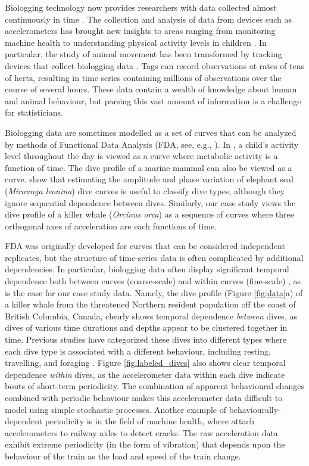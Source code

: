 Biologging technology now provides researchers with data collected almost continuously in time \citep{Hooten:2017}.
The collection and analysis of data from devices such as accelerometers has brought new insights to areas ranging from monitoring machine health \citep{Getman:2009} to understanding physical activity levels in children \citep{Morris:2007}. In particular, the study of animal movement has been transformed by tracking devices that collect biologging data \citep{Borger:2020}. Tags can record observations at rates of tens of hertz, resulting in time series containing millions of observations over the course of several hours. These data contain a wealth of knowledge about human and animal behaviour, but parsing this vast amount of information is a challenge for statisticians.

Biologging data are sometimes modelled as a set of curves that can be analyzed by methods of Functional Data Analysis (FDA, see, e.g., \citealt{Ramsay:2005}). In \cite{Morris:2007}, a child's activity level throughout the day is viewed as a curve where metabolic activity is a function of time. The dive profile of a marine mammal can also be viewed as a curve. \citet{Fu:2017} show that estimating the amplitude and phase variation of elephant seal (\textit{Mirounga leonina}) dive curves is useful to classify dive types, although they ignore sequential dependence between dives. Similarly, our case study views the dive profile of a killer whale (\textit{Orcinus orca}) as a sequence of curves where three orthogonal axes of acceleration are each functions of time.

FDA was originally developed for curves that can be considered independent replicates, but the structure of time-series data is often complicated by additional dependencies. In particular, biologging data often display significant temporal dependence both between curves (coarse-scale) and within curves (fine-scale) \citep{Barajas:2017,Adam:2019}, as is the case for our case study data. Namely, the dive profile (Figure \ref{fig:data}a) of a killer whale from the threatened Northern resident population off the coast of British Columbia, Canada, clearly shows temporal dependence \textit{between} dives, as dives of various time durations and depths appear to be clustered together in time. Previous studies have categorized these dives into different types where each dive type is associated with a different behaviour, including resting, travelling, and foraging \citep{Tennessen:2019b}.
Figure {\ref{fig:labeled_dives}} also shows clear temporal dependence \textit{within} dives, as the accelerometer data within each dive indicate bouts of short-term periodicity. The combination of apparent behavioural changes combined with periodic behaviour makes this accelerometer data difficult to model using simple stochastic processes. Another example of behaviourally-dependent periodicity is in the field of machine health, where \citet{Lucero:2019} attach accelerometers to railway axles to detect cracks. The raw acceleration data exhibit extreme periodicity (in the form of vibration) that depends upon the behaviour of the train as the load and speed of the train change.

